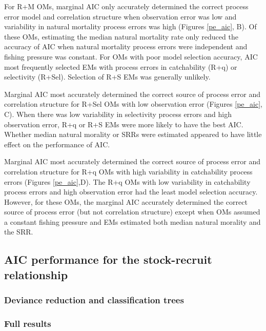 \documentclass[
  12pt,
]{article}
\begin{document}
For R+M OMs, marginal AIC only accurately determined the correct process
error model and correlation structure when observation error was low and
variability in natural mortality process errors was high (Figures
\ref{pe_aic}, B). Of these OMs, estimating the median natural mortality
rate only reduced the accuracy of AIC when natural mortality process
errors were independent and fishing pressure was constant. For OMs with
poor model selection accuracy, AIC most frequently selected EMs with
process errors in catchability (R+q) or selectivity (R+Sel). Selection
of R+S EMs was generally unlikely.

Marginal AIC most accurately determined the correct source of process
error and correlation structure for R+Sel OMs with low observation error
(Figures \ref{pe_aic}, C). When there was low variability in selectivity
process errors and high observation error, R+q or R+S EMs were more
likely to have the best AIC. Whether median natural morality or SRRs
were estimated appeared to have little effect on the performance of AIC.

Marginal AIC most accurately determined the correct source of process
error and correlation structure for R+q OMs with high variability in
catchability process errors (Figures \ref{pe_aic},D). The R+q OMs with
low variability in catchability process errors and high observation
error had the least model selection accuracy. However, for these OMs,
the marginal AIC accurately determined the correct source of process
error (but not correlation structure) except when OMs assumed a constant
fishing pressure and EMs estimated both median natural morality and the
SRR.

\subsection*{AIC performance for the stock-recruit
relationship}\label{aic-performance-for-the-stock-recruit-relationship}

\subsubsection*{Deviance reduction and classification
trees}\label{deviance-reduction-and-classification-trees-2}

\subsubsection*{Full results}\label{full-results-2}
\end{document}
